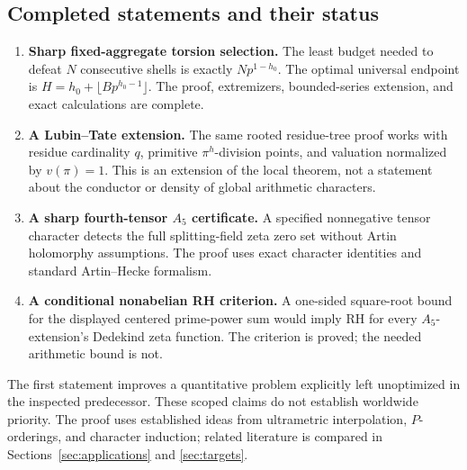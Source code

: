 \subsection{Completed statements and their status}
\begin{enumerate}
\item \textbf{Sharp fixed-aggregate torsion selection.} The least budget needed to defeat \(N\) consecutive shells is exactly \(Np^{1-h_0}\). The optimal universal endpoint is
\(H=h_0+\lfloor Bp^{h_0-1}\rfloor\).
The proof, extremizers, bounded-series extension, and exact calculations are complete.
\item \textbf{A Lubin--Tate extension.} The same rooted residue-tree proof works with residue cardinality \(q\), primitive \(\pi^h\)-division points, and valuation normalized by \(v(\pi)=1\). This is an extension of the local theorem, not a statement about the conductor or density of global arithmetic characters.
\item \textbf{A sharp fourth-tensor \(A_5\) certificate.} A specified nonnegative tensor character detects the full splitting-field zeta zero set without Artin holomorphy assumptions. The proof uses exact character identities and standard Artin--Hecke formalism.
\item \textbf{A conditional nonabelian RH criterion.} A one-sided square-root bound for the displayed centered prime-power sum would imply RH for every \(A_5\)-extension's Dedekind zeta function. The criterion is proved; the needed arithmetic bound is not.
\end{enumerate}

The first statement improves a quantitative problem explicitly left unoptimized in the inspected predecessor. These scoped claims do not establish worldwide priority. The proof uses established ideas from ultrametric interpolation, \(P\)-orderings, and character induction; related literature is compared in Sections~\ref{sec:applications} and \ref{sec:targets}.

